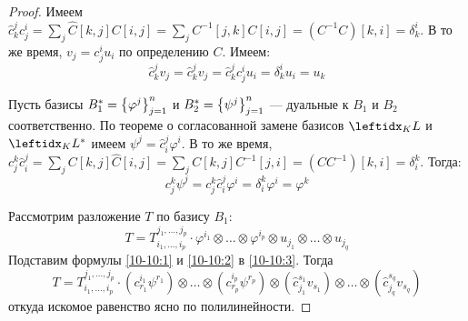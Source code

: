 \begin{proof}
    Имеем $\hat{c}_k^j c_j^i = \sum_j \hat{C}[k, j] C[i, j] = \sum_j C^{-1}[j, k] C[i, j] = (C^{-1}C)[k, i] = \delta_k^i$. В то же время, $v_j = c_j^i u_i$ по определению $C$. Имеем:
    \begin{equation}\label{10-10:1}
        \hat{c}_k^j v_j = \hat{c}_k^j v_j = \hat{c}_k^j c_j^i u_i = \delta_k^i u_i = u_k
    \end{equation}
    
    Пусть базисы $B_1^* = \left\{\varphi^j\right\}_{j=1}^{n}$ и $B_2^* = \left\{\psi^j\right\}_{j=1}^{n}$ --- дуальные к $B_1$ и $B_2$ соответственно. По теореме о согласованной замене базисов $\lsub{K}{L}$ и $\lsub{K}{L^*}$ имеем $\psi^j = \hat{c}_i^j \varphi^{i}$. В то же время, $c_j^k \hat{c}_i^j = \sum_j C[k, j] \hat{C}[i, j] = \sum_j C[k, j] C^{-1}[j, i] = (CC^{-1})[k,i] = \delta_i^k$. Тогда:
    \begin{equation}\label{10-10:2}
        c_j^k \psi^j = c_j^k \hat{c}_i^j \varphi^i = \delta_i^k \varphi^i = \varphi^k
    \end{equation}
    
    Рассмотрим разложение $T$ по базису $B_1$:
    \begin{equation}\label{10-10:3}
        T = T_{i_1, \dots, i_p}^{j_1, \dots, j_p} \cdot \varphi^{i_1} \otimes \ldots \otimes \varphi^{i_p} \otimes u_{j_1} \otimes \ldots \otimes u_{j_q}
    \end{equation}
    Подставим формулы \eqref{10-10:1} и \eqref{10-10:2} в \eqref{10-10:3}. Тогда
    \begin{equation}\label{10-10:4}
       T = T_{i_1, \dots, i_p}^{j_1, \dots, j_p} \cdot (c_{r_1}^{i_1} \psi^{r_1}) \otimes \ldots \otimes (c_{r_p}^{i_p} \psi^{r_p}) \otimes (\hat{c}_{j_1}^{s_1} v_{s_1}) \otimes \ldots \otimes (\hat{c}_{j_q}^{s_q} v_{s_q})
    \end{equation}
    откуда искомое равенство ясно по полилинейности.
\end{proof}